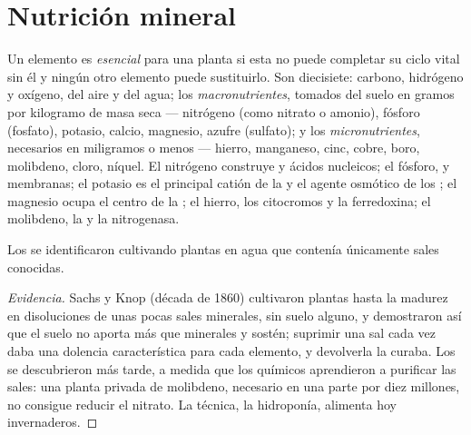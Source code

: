 \section{Nutrición mineral}

\begin{definition}\label{def:b1:plant-water-minerals:elements}
Un elemento es \emph{esencial} para una planta si esta no puede completar su
ciclo vital sin él y ningún otro elemento puede sustituirlo. Son diecisiete:
carbono, hidrógeno y oxígeno, del aire y del agua; los
\emph{macronutrientes}, tomados del suelo en gramos por kilogramo de masa
seca --- nitrógeno (como nitrato o amonio), fósforo (fosfato), potasio,
calcio, magnesio, azufre (sulfato); y los \emph{micronutrientes}, necesarios
en miligramos o menos --- hierro, manganeso, cinc, cobre, boro, molibdeno,
cloro, níquel. El nitrógeno construye  y ácidos nucleicos; el
fósforo,  y membranas; el potasio es el principal catión de la
 y el agente osmótico de los ; el magnesio ocupa el centro de
la ; el hierro, los citocromos y la ferredoxina; el molibdeno, la
 y la nitrogenasa.
\end{definition}

\begin{proposition}\label{prop:b1:plant-water-minerals:hydroponics}
Los  se identificaron cultivando plantas en agua que
contenía únicamente sales conocidas.
\end{proposition}
\begin{proof}[Evidencia]
Sachs y Knop (década de 1860) cultivaron plantas hasta la madurez en
disoluciones de unas pocas sales minerales, sin suelo alguno, y demostraron
así que el suelo no aporta más que minerales y sostén; suprimir una sal cada
vez daba una dolencia característica para cada elemento, y devolverla la
curaba. Los  se descubrieron más tarde, a medida que los
químicos aprendieron a purificar las sales: una planta privada de molibdeno,
necesario en una parte por diez millones, no consigue reducir el nitrato. La
técnica, la hidroponía, alimenta hoy invernaderos.
\end{proof}

